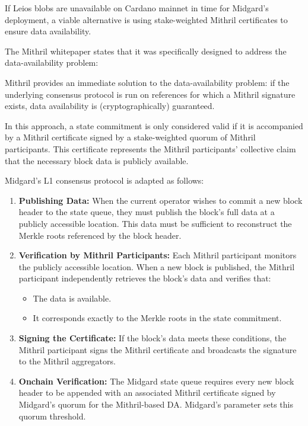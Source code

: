 \documentclass[../midgard.tex]{subfiles}
\begin{document}
If Leios blobs are unavailable on Cardano mainnet in time for Midgard's deployment, a viable alternative is using stake-weighted Mithril certificates to ensure data availability.

The Mithril whitepaper states that it was specifically designed to address the data-availability problem:
\begin{quotePretty}
Mithril provides an immediate solution to the data-availability problem: if the underlying consensus protocol is run on references for which a Mithril signature exists, data availability is (cryptographically) guaranteed.
\end{quotePretty}

In this approach, a state commitment is only considered valid if it is accompanied by a Mithril certificate signed by a stake-weighted quorum of Mithril participants.
This certificate represents the Mithril participants' collective claim that the necessary block data is publicly available.

Midgard's L1 consensus protocol is adapted as follows:
\begin{enumerate}
  \item \textbf{Publishing Data:} When the current operator wishes to commit a new block header to the state queue, they must publish the block's full data at a publicly accessible location.
    This data must be sufficient to reconstruct the Merkle roots referenced by the block header.
  \item \textbf{Verification by Mithril Participants:} Each Mithril participant monitors the publicly accessible location.
    When a new block is published, the Mithril participant independently retrieves the block's data and verifies that:
  \begin{itemize}
    \item The data is available.
    \item It corresponds exactly to the Merkle roots in the state commitment.
  \end{itemize}
  \item \textbf{Signing the Certificate:} If the block's data meets these conditions, the Mithril participant signs the Mithril certificate and broadcasts the signature to the Mithril aggregators.
  \item \textbf{Onchain Verification:} The Midgard state queue requires every new block header to be appended with an associated Mithril certificate signed by Midgard's quorum for the Mithril-based DA.
    Midgard's  parameter sets this quorum threshold.
\end{enumerate}
\end{document}
